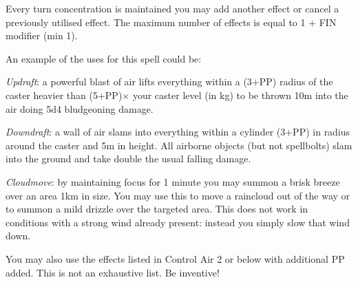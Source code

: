 \begin{multicols}{3}
{Every turn concentration is maintained you may add another effect\comma{} or cancel a previously utilised effect. The maximum number of effects is equal to 1 + FIN modifier (min 1). 

An example of the uses for this spell could be:

\begin{spellitemize}
\item {\it Updraft}: a powerful blast of air lifts everything within a (3+PP) radius of the caster heavier than (5+PP)$\times$ your caster level (in kg) to be thrown 10m into the air\comma{} doing 5d4 bludgeoning damage. 
\item {\it Downdraft}: a wall of air slams into everything within a cylinder  (3+PP) in radius around the caster and 5m in height. All airborne objects (but not spell\minus{}bolts) slam into the ground and take double the usual falling damage. 

\item {\it Cloudmove}: by maintaining focus for 1 minute\comma{} you may summon a brisk breeze over an area 1km in size. You may use this to move a raincloud out of the way\comma{} or to summon a mild drizzle over the targeted area. This does not work in conditions with a strong wind already present: instead you simply slow that wind down. 

\end{spellitemize}
You may also use the effects listed in Control Air 2 or below with \PPDifference{\DVAdp}{\DVNov} additional PP added. 
This is not an exhaustive list. Be inventive!}
\end{multicols}
